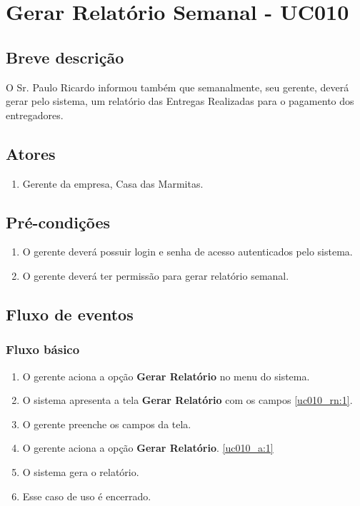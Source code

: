 \chapter{Gerar Relatório Semanal - UC010} \label{uc010}

\section{Breve descrição}

O Sr. Paulo Ricardo informou também que semanalmente, seu gerente, deverá gerar pelo sistema, um relatório das Entregas Realizadas para o pagamento dos entregadores.

\section{Atores}

\begin{enumerate}
	\item Gerente da empresa, Casa das Marmitas.
\end{enumerate}

\section{Pré-condições}

\begin{enumerate}
	\item O gerente deverá possuir login e senha de acesso autenticados pelo sistema.
	\item O gerente deverá ter permissão para gerar relatório semanal.
\end{enumerate}

\section{Fluxo de eventos}

\subsection{Fluxo básico}

\begin{enumerate}[label=P\arabic*]
	\item O gerente aciona a opção \textbf{Gerar Relatório} no menu do sistema. \label{uc010_p:1}
	\item O sistema apresenta a tela \textbf{Gerar Relatório} com os campos \ref{uc010_rn:1}.	
	\item O gerente preenche os campos da tela. \label{uc010_p:3}	
	\item O gerente aciona a opção \textbf{Gerar Relatório}. \label{uc010_p:4}\ref{uc010_a:1}	
	\item O sistema gera o relatório.
	\item Esse caso de uso é encerrado.	
\end{enumerate}

